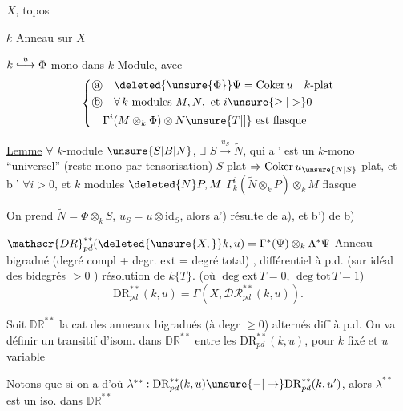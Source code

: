 $X$, topos

$k$ Anneau sur $X$

$k\overset{u}{\lhook\joinrel\longrightarrow}\Phi$ mono dans $k$-Module, avec
\[
\left\{\begin{aligned}
&\text{\textcircled{a}}\quad \deleted{\unsure{\Phi}}\Psi=\operatorname{Coker}u\quad k\text{-plat}\\
&\text{\textcircled{b}}\quad\forall\, k\text{-modules }M,N,\ \text{et }i\unsure{\geq|>}0\\
&\hspace{1em}\Gamma^i(M\otimes_k\Phi)\otimes N\unsure{T|]}\ \text{est flasque}
\end{aligned}\right.
\]

\uline{Lemme} $\forall$ $k$-module $\unsure{S|B|N}$, $\exists$  $S\xrightarrow{u_S}\widetilde N$, qui \textcircled{a'} est un $k$-mono \textquotedblleft universel'' (reste mono par tensorisation)  $S$ plat $\Rightarrow\operatorname{Coker}u_{\unsure{N|S}}$ plat, et \textcircled{b'} $\forall i>0$, et $k$ modules $\deleted{N}P,M$ $\Gamma_k^i(\widetilde N\otimes_k P)\otimes_k M$ flasque

On prend $\widetilde N=\Phi\otimes_k S$, $u_S=u\otimes\mathrm{id}_S$, alors a') résulte de a), et b') de b)

$\mathscr{DR}^{**}_{pd}(\deleted{\unsure{X,}}k,u)=\Gamma^*(\Psi)\otimes_k\Lambda^*\Psi$ Anneau bigradué (degré compl + degr. ext = degré total) , différentiel à p.d. (sur idéal des bidegrés $>0$ )  résolution de $k\{T\}$. (où $\deg\mathrm{ext}\,T=0$, $\deg\mathrm{tot}\,T=1$)
\[
\mathrm{DR}_{pd}^{**}(k,u)=\Gamma(X,\mathscr{DR}_{pd}^{**}(k,u)).
\]

Soit $\mathbb{DR}^{**}$ la cat  des anneaux bigradués (à degr $\geq 0$) alternés diff à p.d.  On va définir un  transitif d'isom. dans $\mathbb{DR}^{**}$ entre les $\mathrm{DR}_{pd}^{**}(k,u)$, pour $k$ fixé et $u$ variable

Notons que si on a
d'où $\lambda^{**}:\mathrm{DR}_{pd}^{**}(k,u)\unsure{\mathord{-}|\to}\mathrm{DR}_{pd}^{**}(k,u')$, alors $\lambda^{**}$ est un iso. dans $\mathbb{DR}^{**}$

